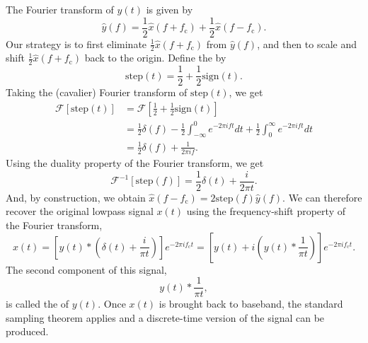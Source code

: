 The Fourier transform of $y(t)$ is given by
\begin{equation*}
\hat{y}(f) = \frac{1}{2} \hat{x}(f+f_{\mathrm{c}}) + \frac{1}{2} \hat{x}(f - f_{\mathrm{c}}) .
\end{equation*}
Our strategy is to first eliminate $\frac{1}{2} \hat{x}(f + f_{\mathrm{c}})$ from $\hat{y}(f)$, and then to scale and shift $\frac{1}{2} \hat{x}(f + f_{\mathrm{c}})$ back to the origin.
Define the  by
\begin{equation*}
\mathrm{step} (t) = \frac{1}{2} + \frac{1}{2} \mathrm{sign}(t). 
\end{equation*}
Taking the (cavalier) Fourier transform of $\mathrm{step}(t)$, we get
\begin{equation*}
\begin{split}
{\mathcal{F}} [\mathrm{step} (t)]
&= {\mathcal{F}} \left[ \frac{1}{2} + \frac{1}{2} \mathrm{sign}(t) \right] \\
&= \frac{1}{2} \delta (f)
- \frac{1}{2} \int_{-\infty}^0 e^{-2 \pi i ft} dt
+ \frac{1}{2} \int_0^{\infty} e^{-2 \pi i ft} dt \\
&= \frac{1}{2} \delta(f)  + \frac{1}{2 \pi i f}.
\end{split}
\end{equation*}
Using the duality property of the Fourier transform, we get
\begin{equation*}
\mathcal{F}^{-1} [\mathrm{step}(f)] = \frac{1}{2} \delta(t) + \frac{i}{2 \pi t} .
\end{equation*}
And, by construction, we obtain $\hat{x}(f - f_{\mathrm{c}}) = 2 \mathrm{step}(f) \hat{y}(f)$.
We can therefore recover the original lowpass signal $x(t)$ using the frequency-shift property of the Fourier transform,
\begin{equation*}
x(t)
= \left[ y(t) \ast \left( \delta (t) + \frac{i}{\pi t} \right) \right]
e^{- 2 \pi i f_{\mathrm{c}} t}
= \left[ y(t) + i \left( y(t) \ast \frac{1}{\pi t} \right) \right] e^{- 2 \pi i f_{\mathrm{c}} t} .
\end{equation*}
The second component of this signal,
\begin{equation*}
y(t) \ast \frac{1}{\pi t} ,
\end{equation*}
is called the  of $y(t)$.
Once $x(t)$ is brought back to baseband, the standard sampling theorem applies and a discrete-time version of the signal can be produced.


